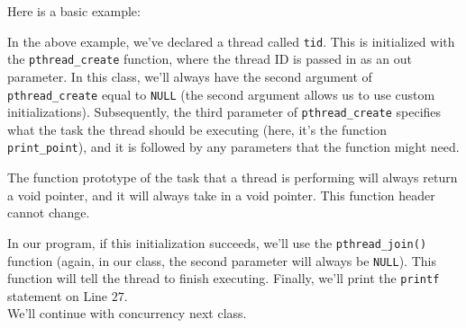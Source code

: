 Here is a basic example:


\lstset{caption=Threads Example 1}
\begin{center}

\end{center}

In the above example, we've declared a thread called \verb!tid!. This is initialized with the \verb!pthread_create! function, where the thread ID is passed in as an out parameter. In this class, we'll always have the second argument of \verb!pthread_create! equal to \verb!NULL! (the second argument allows us to use custom initializations). Subsequently, the third parameter of \verb!pthread_create! specifies what the task the thread should be executing (here, it's the function \verb!print_point!), and it is followed by any parameters that the function might need. 


The function prototype of the task that a thread is performing will always return a void pointer, and it will always take in a void pointer. This function header cannot change.

In our program, if this initialization succeeds, we'll use the \verb!pthread_join()! function (again, in our class, the second parameter will always be \verb!NULL!). This function will tell the thread to finish executing. Finally, we'll print the \verb!printf! statement on Line $27$. \\

We'll continue with concurrency next class.